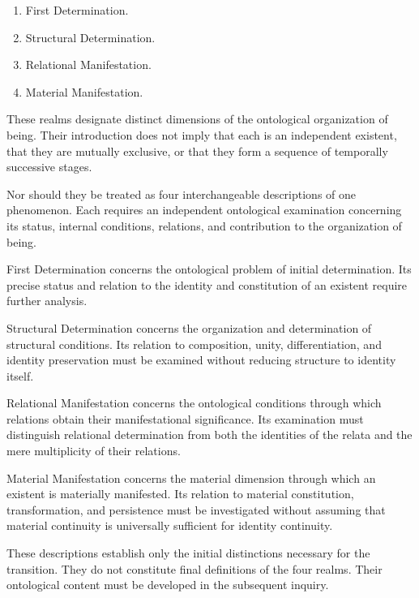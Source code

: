\begin{enumerate}
    \item First Determination.
    \item Structural Determination.
    \item Relational Manifestation.
    \item Material Manifestation.
\end{enumerate}

These realms designate distinct dimensions of the
ontological organization of being. Their introduction
does not imply that each is an independent existent,
that they are mutually exclusive, or that they form
a sequence of temporally successive stages.

Nor should they be treated as four interchangeable
descriptions of one phenomenon. Each requires an
independent ontological examination concerning its
status, internal conditions, relations, and contribution
to the organization of being.

First Determination concerns the ontological problem
of initial determination. Its precise status and
relation to the identity and constitution of an
existent require further analysis.

Structural Determination concerns the organization
and determination of structural conditions. Its
relation to composition, unity, differentiation,
and identity preservation must be examined without
reducing structure to identity itself.

Relational Manifestation concerns the ontological
conditions through which relations obtain their
manifestational significance. Its examination must
distinguish relational determination from both the
identities of the relata and the mere multiplicity
of their relations.

Material Manifestation concerns the material dimension
through which an existent is materially manifested.
Its relation to material constitution, transformation,
and persistence must be investigated without assuming
that material continuity is universally sufficient
for identity continuity.

These descriptions establish only the initial
distinctions necessary for the transition. They do
not constitute final definitions of the four realms.
Their ontological content must be developed in the
subsequent inquiry.


